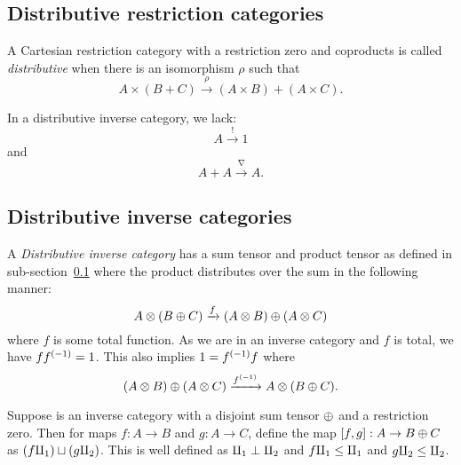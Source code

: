 \subsection{Distributive restriction categories} %
\label{sub:distributive_restriction_categories}


\begin{definition}
  A Cartesian restriction category with a restriction zero and coproducts is called
  \emph{distributive} when there is an isomorphism $\rho$ such that
  \[
    A\times (B+C) \xrightarrow{\rho} (A\times B) +(A\times C).
  \]
\end{definition}

In a distributive inverse category, we lack:
\[
  A  \xrightarrow{!} 1
\]
and
\[
  A+A \xrightarrow{\nabla} A.
\]

\subsection{Distributive inverse categories} %
\label{sub:distributive_inverse_categories}
%

A \emph{Distributive inverse category} has a sum tensor and product tensor as defined in
sub-section~\ref{sub:distributive_restriction_categories} where the product distributes over the sum
in the following manner:
\[
  A \otimes (B \oplus C) \xrightarrow{f}(A\otimes B) \oplus (A \otimes C)
\]
where $f$ is some total function. As we are in an inverse category and $f$ is total, we have $f
{f}^{(-1)} = 1$. This also implies $1 = {f}^{(-1)} f$ where
\[
  (A\otimes B) \oplus (A \otimes C) \xrightarrow{{f}^{(-1)}} A \otimes (B \oplus C).
\]

\begin{definition}\label{def:join_of_arbitrary_maps}
  Suppose \X is an inverse category with a disjoint sum tensor $\oplus$ and a restriction zero.
  Then for maps $f:A \to B$ and $g:A \to C$, define the map $[f,g]:A \to B\oplus C$ as
  $(f \amalg_{1}) \sqcup (g \amalg_{2})$. This is well defined as $\amalg_{1} \perp \amalg_{2}$ and $f\amalg_{1} \le \amalg_{1}$ and
  $g \amalg_{2} \le \amalg_{2}$.
\end{definition}

